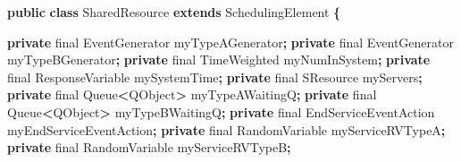 \documentclass[
]{book}
\newenvironment{Shaded}{\begin{snugshade}}{\end{snugshade}}
\newcommand{\BuiltInTok}[1]{#1}
\newcommand{\DataTypeTok}[1]{\textcolor[rgb]{0.13,0.29,0.53}{#1}}
\newcommand{\KeywordTok}[1]{\textcolor[rgb]{0.13,0.29,0.53}{\textbf{#1}}}
\newcommand{\NormalTok}[1]{#1}
\newcommand{\OperatorTok}[1]{\textcolor[rgb]{0.81,0.36,0.00}{\textbf{#1}}}
\theoremstyle{definition}
\theoremstyle{definition}
\theoremstyle{definition}
\theoremstyle{definition}
\theoremstyle{remark}
\begin{document}
\begin{Shaded}
\begin{Highlighting}[]
\KeywordTok{public} \KeywordTok{class}\NormalTok{ SharedResource }\KeywordTok{extends}\NormalTok{ SchedulingElement }\OperatorTok{\{}

    \KeywordTok{private} \DataTypeTok{final}\NormalTok{ EventGenerator myTypeAGenerator}\OperatorTok{;}
    \KeywordTok{private} \DataTypeTok{final}\NormalTok{ EventGenerator myTypeBGenerator}\OperatorTok{;}
    \KeywordTok{private} \DataTypeTok{final}\NormalTok{ TimeWeighted myNumInSystem}\OperatorTok{;}
    \KeywordTok{private} \DataTypeTok{final}\NormalTok{ ResponseVariable mySystemTime}\OperatorTok{;}
    \KeywordTok{private} \DataTypeTok{final}\NormalTok{ SResource myServers}\OperatorTok{;}
    \KeywordTok{private} \DataTypeTok{final} \BuiltInTok{Queue}\OperatorTok{\textless{}}\NormalTok{QObject}\OperatorTok{\textgreater{}}\NormalTok{ myTypeAWaitingQ}\OperatorTok{;}
    \KeywordTok{private} \DataTypeTok{final} \BuiltInTok{Queue}\OperatorTok{\textless{}}\NormalTok{QObject}\OperatorTok{\textgreater{}}\NormalTok{ myTypeBWaitingQ}\OperatorTok{;}
    \KeywordTok{private} \DataTypeTok{final}\NormalTok{ EndServiceEventAction myEndServiceEventAction}\OperatorTok{;}
    \KeywordTok{private} \DataTypeTok{final}\NormalTok{ RandomVariable myServiceRVTypeA}\OperatorTok{;}
    \KeywordTok{private} \DataTypeTok{final}\NormalTok{ RandomVariable myServiceRVTypeB}\OperatorTok{;}
    

\end{Highlighting}
\end{Shaded}
\end{document}
